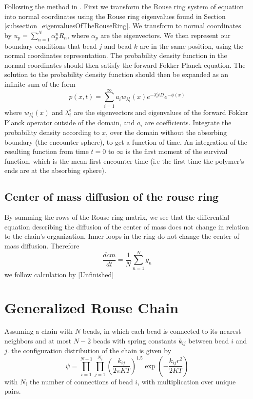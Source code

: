 \documentclass{paper}
\begin{document}
Following the method in \cite{amitai2012computation}. First we transform the Rouse ring system of equation into normal coordinates using the Rouse ring eigenvalues found in Section \ref{subsection_eigenvaluesOfTheRouseRing}. We transform to normal coordinates by $u_p=\sum_{n=1}^N \alpha_p^nR_n$, where $\alpha_p$ are the eigenvectors. We then represent our boundary conditions that bead $j$ and bead $k$ are in the same position, using the normal coordinates representation. The probability density function in the normal coordinates should then satisfy the forward Fokker Planck equation. The solution to the probability density function should then be expanded as an infinite sum of the form 
\begin{equation*}
p(x,t)=\sum_{i=1}^\infty a_iw_{\lambda_i^\epsilon}(x)e^{-\lambda_i^\epsilon tD}e^{-\phi(x)}
\end{equation*}
where $w_{\lambda_i^\epsilon}(x)$ and $\lambda_i^\epsilon$ are the eigenvectors and eigenvalues of the forward Fokker Planck operator outside of the domain, and $a_i$ are coefficients. Integrate the probability density according to $x$, over the domain without the absorbing boundary (the encounter sphere), to get a function of time. An integration of the resulting function from time $t=0$ to $\infty$ is the first moment of the survival function, which is the mean first encounter time (i.e the first time the polymer's ends are at the absorbing sphere). 


\subsection{Center of mass diffusion of the rouse ring}\label{subsection_centerOfMassDiffusionOfTheRouseRing}
By summing the rows of the Rouse ring matrix, we see that the differential equation describing the diffusion of the center of mass does not change in relation to the chain's organization. Inner loops in the ring do not change the center of mass diffusion. Therefore 
\begin{equation*}
\frac{dcm}{dt} = \frac{1}{N}\sum_{n=1}^N g_n
\end{equation*}
we follow calculation by 
[Unfinished]

\section{Generalized Rouse Chain}\label{section_generalizedRouseChain}
Assuming a chain with $N$ beads, in which each bead is connected to its nearest neighbors and at most $N-2$ beads with spring constants $k_{ij}$ between bead $i$ and $j$. the configuration distribution of the chain is given by 
\begin{equation*}
\psi = \prod_{i=1}^{N-1}\prod_{j=1}^{N_i}\left(\frac{k_{ij}}{2\pi KT}\right)^{1.5}\exp\left(-\frac{k_{ij}r^2}{2KT}\right)
\end{equation*}
with $N_i$ the number of connections of bead $i$, with multiplication over unique pairs. 
\end{document}
